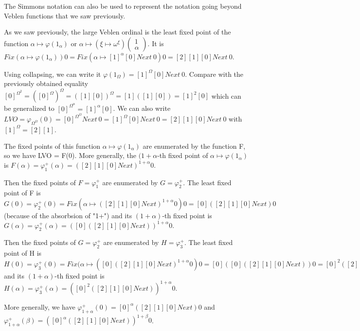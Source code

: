 \documentclass[10pt]{article}
\begin{document}
\bigskip

The Simmons notation can also be used to represent the notation going beyond Veblen functions that we saw previously.

As we saw previously, the large Veblen ordinal is the least fixed point of the function \( \alpha \mapsto \varphi(1_\alpha) \) or \( \alpha \mapsto (\xi \mapsto \omega^\xi) \begin{pmatrix} 1 \\ \alpha \end{pmatrix} \). It is \( Fix (\alpha \mapsto \varphi(1_\alpha)) 0 = Fix (\alpha \mapsto [1]^\alpha [0] Next\ 0) 0 = [2] [1] [0] Next\ 0 \). 

Using collapsing, we can write it \( \varphi(1_\Omega) = [1]^\Omega [0] Next\ 0 \). Compare with the previously obtained equality \( [0]^{\Omega^2} = ([0]^\Omega)^\Omega = ([1] [0])^\Omega = [1] ([1] [0]) = [1]^2 [0] \) which can be generalized to \( [0]^{\Omega^\alpha} = [1]^\alpha [0] \). We can also write \( LVO = \varphi_{\Omega^\Omega}(0) = [0]^{\Omega^\Omega} Next\ 0 = [1]^\Omega [0] Next\ 0 = [2] [1] [0] Next\ 0 \) with \( [1]^\Omega = [2] [1] \).

\bigskip

The fixed points of this function \( \alpha \mapsto \varphi(1_\alpha) \) are enumerated by the function F, so we have LVO = F(0). More generally, the \( (1+\alpha\)-th fixed point of  \( \alpha \mapsto \varphi(1_\alpha) \) is \( F(\alpha) = \varphi^+_1(\alpha) = ([2] [1] [0] Next)^{1+\alpha} 0 \).

Then the fixed points of \( F = \varphi^+_1 \) are enumerated by \( G = \varphi^+_2 \). The least fixed point of F is \( G(0) = \varphi^+_2(0) = Fix (\alpha \mapsto ([2] [1] [0] Next)^{1+\alpha} 0) 0 = [0] ([2] [1] [0] Next) 0 \) (because of the absorbsion of "1+") and its \( (1+\alpha) \)-th fixed point is \( G(\alpha) = \varphi^+_2(\alpha) = ([0] ([2] [1] [0] Next))^{1+\alpha} 0 \).

Then the fixed points of \( G = \varphi^+_2 \) are enumerated by \( H = \varphi^+_3 \). The least fixed point of H is \( H(0) = \varphi^+_3(0) = Fix (\alpha \mapsto ([0] ([2] [1] [0] Next)^{1+\alpha} 0) 0 = [0] ([0] ([2] [1] [0] Next)) 0 = [0]^2 ([2] [1] [0] Next) 0 \) and its \( (1+\alpha) \)-th fixed point is \( H(\alpha) = \varphi^+_3(\alpha) = ([0]^2 ([2] [1] [0] Next))^{1+\alpha} 0 \).

More generally, we have \( \varphi^+_{1+\alpha}(0) = [0]^\alpha ([2] [1] [0] Next) 0 \) and \( \varphi^+_{1+\alpha}(\beta) = ([0]^\alpha ([2] [1] [0] Next))^{1+\beta} 0 \).
\end{document}
